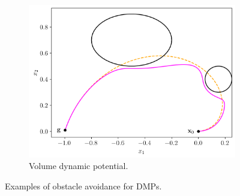 \documentclass[fleqn, 11pt]{article}
\theoremstyle{definition}
\theoremstyle{plain}
\theoremstyle{remark}
\begin{document}
\begin{figure}[t]
\begin{subfigure}{0.45\linewidth}
        \includegraphics[width=\textwidth]{imgs/two_obst_volume_dynamic.png}
        \caption{Volume dynamic potential.}
    \end{subfigure}
    \caption{Examples of obstacle avoidance for DMPs.}
    \label{fig:obst_example}
\end{figure}



\end{document}

